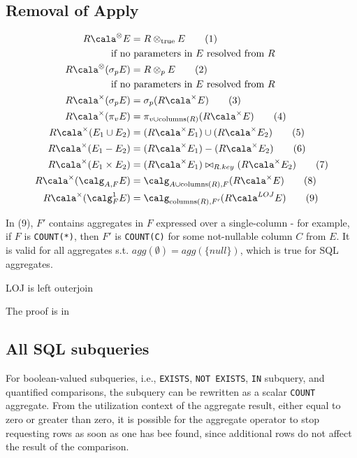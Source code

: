 \documentclass[11pt]{article}
\begin{document}
\subsection{Removal of Apply}
\label{sec:orgf052fcf}
\begin{align*}
R\cala^{\otimes}E&=R\otimes_{\text{true}}E\tag{1}\\
&\hspace{-0.7cm}\text{if no parameters in \(E\) resolved from \(R\)}\\
R\cala^{\otimes}(\sigma_pE)&=R\otimes_pE\tag{2}\\
&\hspace{-0.7cm}\text{if no parameters in \(E\) resolved from \(R\)}\\
R\cala^\times(\sigma_pE)&=\sigma_p(R\cala^\times E)\tag{3}\\
R\cala^\times(\pi_vE)&=\pi_{v\cup\text{columns}(R)}(R\cala^\times E)\tag{4}\\
R\cala^\times(E_1\cup E_2)&=(R\cala^\times E_1)\cup(R\cala^\times E_2)\tag{5}\\
R\cala^\times(E_1- E_2)&=(R\cala^\times E_1)-(R\cala^\times E_2)\tag{6}\\
R\cala^\times(E_1\times E_2)&=(R\cala^\times E_1)\bowtie_{R.key}(R\cala^\times E_2)\tag{7}\\
R\cala^\times(\calg_{A,F}E)&=\calg_{A\cup\text{columns}(R),F}(R\cala^\times E)\tag{8}\\
R\cala^\times(\calg^1_FE)&=\calg_{\text{columns}(R),F'}(R\cala^{LOJ}E)\tag{9}
\end{align*}


In (9), \(F'\) contains aggregates in \(F\) expressed over a single-column - for example, if \(F\) is
\texttt{COUNT(*)}, then \(F'\) is \texttt{COUNT(C)} for some not-nullable column \(C\) from \(E\). It is valid for all
aggregates s.t. \(agg(\emptyset)=agg(\{null\})\), which is true for SQL aggregates.

LOJ is left outerjoin

The proof is in \cite{galindo-legaria2000parameterized}
\subsection{All SQL subqueries}
\label{sec:orgb7e102b}
For boolean-valued subqueries, i.e., \texttt{EXISTS}, \texttt{NOT EXISTS}, \texttt{IN} subquery, and quantified comparisons, the
subquery can be rewritten as a scalar \texttt{COUNT} aggregate. From the utilization context of the aggregate
result, either equal to zero or greater than zero, it is possible for the aggregate operator to stop
requesting rows as soon as one has bee found, since additional rows do not affect the result of the
comparison.
\end{document}
